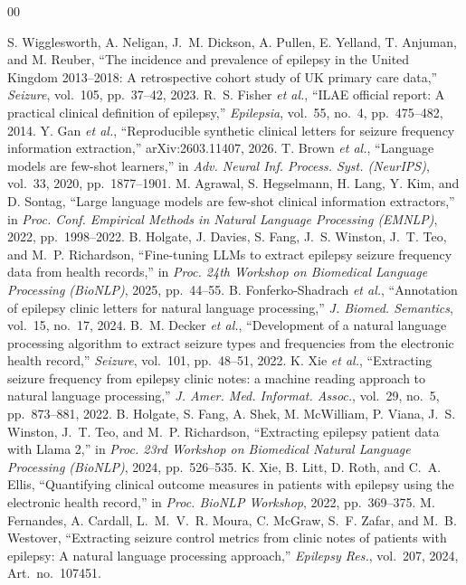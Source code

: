 \documentclass[conference]{IEEEtran}
\begin{document}
\begin{thebibliography}{00}

 S. Wigglesworth, A. Neligan, J.~M. Dickson, A. Pullen, E. Yelland, T. Anjuman, and M. Reuber, ``The incidence and prevalence of epilepsy in the United Kingdom 2013--2018: A retrospective cohort study of UK primary care data,'' \emph{Seizure}, vol.~105, pp.~37--42, 2023.
 R.~S. Fisher \emph{et al.}, ``ILAE official report: A practical clinical definition of epilepsy,'' \emph{Epilepsia}, vol.~55, no.~4, pp.~475--482, 2014.
 Y. Gan \emph{et al.}, ``Reproducible synthetic clinical letters for seizure frequency information extraction,'' arXiv:2603.11407, 2026.
 T. Brown \emph{et al.}, ``Language models are few-shot learners,'' in \emph{Adv. Neural Inf. Process. Syst. (NeurIPS)}, vol.~33, 2020, pp.~1877--1901.
 M. Agrawal, S. Hegselmann, H. Lang, Y. Kim, and D. Sontag, ``Large language models are few-shot clinical information extractors,'' in \emph{Proc. Conf. Empirical Methods in Natural Language Processing (EMNLP)}, 2022, pp.~1998--2022.
 B. Holgate, J. Davies, S. Fang, J.~S. Winston, J.~T. Teo, and M.~P. Richardson, ``Fine-tuning LLMs to extract epilepsy seizure frequency data from health records,'' in \emph{Proc. 24th Workshop on Biomedical Language Processing (BioNLP)}, 2025, pp.~44--55.
 B. Fonferko-Shadrach \emph{et al.}, ``Annotation of epilepsy clinic letters for natural language processing,'' \emph{J. Biomed. Semantics}, vol.~15, no.~17, 2024.
 B.~M. Decker \emph{et al.}, ``Development of a natural language processing algorithm to extract seizure types and frequencies from the electronic health record,'' \emph{Seizure}, vol.~101, pp.~48--51, 2022.
 K. Xie \emph{et al.}, ``Extracting seizure frequency from epilepsy clinic notes: a machine reading approach to natural language processing,'' \emph{J. Amer. Med. Informat. Assoc.}, vol.~29, no.~5, pp.~873--881, 2022.
 B. Holgate, S. Fang, A. Shek, M. McWilliam, P. Viana, J.~S. Winston, J.~T. Teo, and M.~P. Richardson, ``Extracting epilepsy patient data with Llama 2,'' in \emph{Proc. 23rd Workshop on Biomedical Natural Language Processing (BioNLP)}, 2024, pp.~526--535.
 K. Xie, B. Litt, D. Roth, and C.~A. Ellis, ``Quantifying clinical outcome measures in patients with epilepsy using the electronic health record,'' in \emph{Proc. BioNLP Workshop}, 2022, pp.~369--375.
 M. Fernandes, A. Cardall, L.~M.~V.~R. Moura, C. McGraw, S.~F. Zafar, and M.~B. Westover, ``Extracting seizure control metrics from clinic notes of patients with epilepsy: A natural language processing approach,'' \emph{Epilepsy Res.}, vol.~207, 2024, Art.~no.~107451.

\end{thebibliography}
\end{document}
